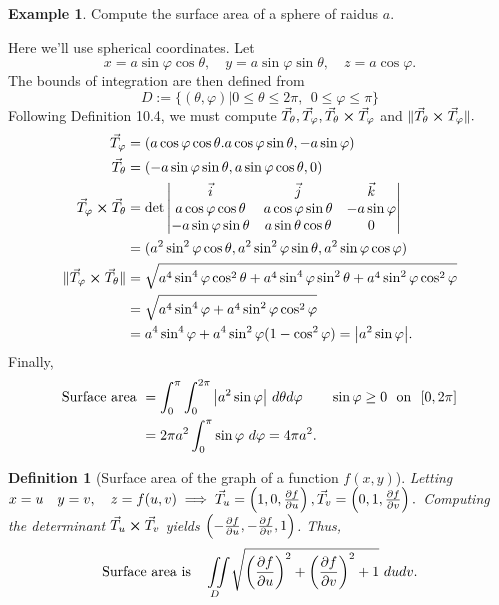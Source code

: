 \documentclass[
	12pt,
	]{article}
\DeclarePairedDelimiter{\norm}{\lVert}{\rVert}
\theoremstyle{custom}
\theoremstyle{custom}
\theoremstyle{custom}
\theoremstyle{custom}
\newtheorem{definition}{Definition}[section]
\theoremstyle{custom}
\theoremstyle{definition}
\newtheorem{example}{Example}[section]
\theoremstyle{example}
\theoremstyle{note}
\theoremstyle{remark}
\theoremstyle{example}
\newcounter{theo}[section]\setcounter{theo}{0}
\numberwithin{equation}{subsection}
\begin{document}
				\begin{example}
					Compute the surface area of a sphere of raidus $a$. 
					
					\noindent Here we'll use spherical coordinates. Let 
					$$ x = a\sin \varphi \cos \theta ,\quad y = a\sin\varphi\sin\theta,\quad z=a\cos \varphi.$$
					The bounds of integration are then defined from 
					$$ D := \{(\theta, \varphi) | 0 \le \theta \le 2\pi , \ \ 0\le \varphi \le \pi \}$$
					Following Definition 10.4, we must compute $\vec{T}_{\theta}, \vec{T}_{\varphi} , \vec{T}_{\theta} \cross \vec{T}_{\varphi}$ and $\norm{\vec{T}_{\theta} \cross \vec{T}_{\varphi}}.$
					\begin{align*}
						\vec{T}_{\varphi} &= (a\cos\varphi\cos \theta . a\cos \varphi \sin\theta, -a\sin\varphi) \\
						\vec{T}_{\theta} &= (-a\sin\varphi\sin\theta ,a\sin\varphi\cos\theta, 0) \\
						\vec{T}_{\varphi} \cross \vec{T}_{\theta} &= \det 
						\begin{vmatrix}
							\vec{i} & \vec{j} & \vec{k} \\
							a\cos\varphi\cos\theta & a\cos\varphi\sin\theta & -a\sin\varphi \\
							-a\sin\varphi\sin\theta & a\sin\theta\cos\theta & 0
						\end{vmatrix} \\
						&= (a^{2}\sin^{2}\varphi \cos\theta, a^{2}\sin^{2}\varphi\sin\theta, a^{2}\sin\varphi\cos\varphi) \\
						\norm{\vec{T}_{\varphi} \cross \vec{T}_{\theta}} &= \sqrt{a^{4}\sin^{4}\varphi \cos^{2}\theta + a^{4}\sin^{4}\varphi \sin^{2}\theta + a^{4} \sin^{2}\varphi \cos^{2}\varphi} \\
						&=\sqrt{a^{4}\sin^{4}\varphi + a^{4}\sin^{2}\varphi \cos^{2}\varphi}\\
						&=a^{4}\sin^{4}\varphi + a^{4}\sin^{2}\varphi (1-\cos^{2}\varphi) = \abs{a^{2}\sin\varphi}.
					\end{align*}
					Finally, 
					\begin{align*}
						\text{Surface area } &= \int_{0}^{\pi} \int_{0}^{2\pi} \abs{a^{2}\sin\varphi} \ d\theta d\varphi \qquad \sin\varphi \ge 0 \ \text{ on } \ [0,2\pi]\\
						&= 2\pi a^{2}\int_{0}^{\pi} \sin\varphi \ d\varphi = 4\pi a^{2}.
					\end{align*}
				\end{example}
				
				\begin{definition}[Surface area of the graph of a function $f(x,y)$]
					Letting $x= u \quad y= v, \quad z= f(u,v) \implies \vec{T}_{u} =\left(1,0,\pdv{f}{u}\right) , \vec{T}_{v} = \left(0,1,\pdv{f}{v}\right).$
					Computing the determinant $\vec{T}_{u} \cross \vec{T}_{v}$ yields $\left(-\pdv{f}{u} , -\pdv{f}{v} , 1\right)$. Thus, 
					\begin{equation} 
					\text{Surface area is } \ \ \iint\limits_{D} \sqrt{\left(\pdv{f}{u}\right)^{2} + \left(\pdv{f}{v}\right)^{2} +1} \ du dv.
					\end{equation}
				\end{definition}
				
\end{document}
